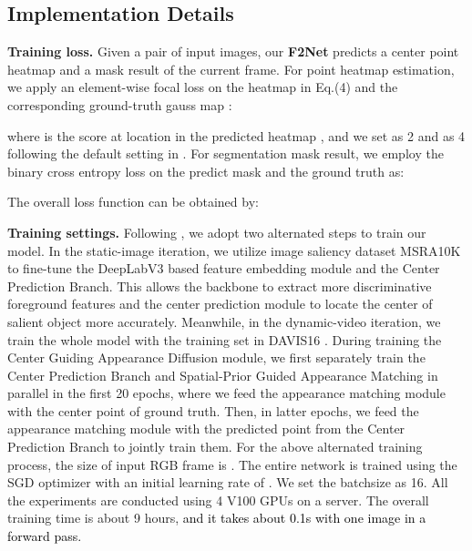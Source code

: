 \documentclass[letterpaper]{article} \usepackage{aaai20}  \usepackage{times}  \usepackage{helvet} \usepackage{courier}  \usepackage[hyphens]{url}  \usepackage{graphicx} \urlstyle{rm} \def\UrlFont{\rm}  \usepackage{graphicx}  \frenchspacing  \setlength{\pdfpagewidth}{8.5in}  \setlength{\pdfpageheight}{11in}  \usepackage{amssymb}
\newcommand{\ldz}[1]{\textcolor{black}{#1}}
\begin{document}
\subsection{Implementation Details}
\noindent \textbf{Training loss.}
Given a pair of input images, our \textbf{F2Net} predicts a center point heatmap  and a mask result  of the current frame.
For point heatmap estimation, we apply an element-wise focal loss \cite{lin2017focal} on the heatmap  in Eq.(4) and the corresponding ground-truth gauss map :

where  is the score at location  in the predicted heatmap , and we set  as 2 and  as 4 following the default setting in \cite{law2018cornernet}. For segmentation mask result, we employ the binary cross entropy loss on the predict mask  and the ground truth  as:

The overall loss function can be obtained by:


\noindent \textbf{Training settings.} Following \cite{wang2019zero,lu2019see}, we adopt two alternated steps to train our model. In the static-image iteration, we utilize image saliency dataset MSRA10K \cite{cheng2014global} to fine-tune the DeepLabV3 based feature embedding module and the Center Prediction Branch. This allows the backbone to extract more discriminative foreground features and the center prediction module to locate the center of salient object more accurately. Meanwhile, in the dynamic-video iteration, we train the whole model with the training set in DAVIS16 \cite{perazzi2016benchmark}. During training the Center Guiding Appearance Diffusion module, we first separately train the Center Prediction Branch and Spatial-Prior Guided Appearance Matching in parallel in the first 20 epochs, where we feed the appearance matching module with the center point of ground truth. Then, in latter epochs, we feed the appearance matching module with the predicted point from the Center Prediction Branch to jointly train them.
For the above alternated training process, the size of input RGB frame is . The entire network is trained using the SGD optimizer with an initial learning rate of . We set the batchsize as 16. All the experiments are conducted using 4 V100 GPUs on a server. The overall training time is about 9 hours, \ldz{and it takes about 0.1s with one image in a forward pass.}
\end{document}
